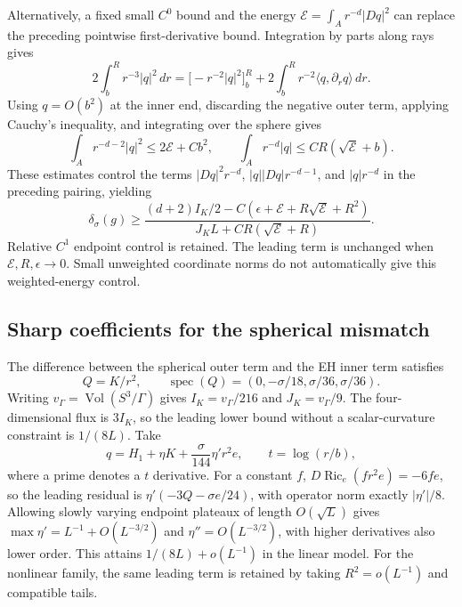 \documentclass[a4paper,11pt]{article}
\numberwithin{equation}{section}
\theoremstyle{definition}
\newcommand{\Ric}{\operatorname{Ric}}
\newcommand{\Vol}{\operatorname{Vol}}
\begin{document}
Alternatively, a fixed small $C^0$ bound and the energy
$\mathcal E=\int_A r^{-d}|Dq|^2$ can replace the preceding pointwise first-derivative bound.
Integration by parts along rays gives
\[
2\int_b^Rr^{-3}|q|^2\,dr
=\bigl[-r^{-2}|q|^2\bigr]_b^R+
2\int_b^Rr^{-2}\langle q,\partial_rq\rangle\,dr.
\]
Using $q=O(b^2)$ at the inner end, discarding the negative outer term, applying Cauchy's inequality, and integrating over the sphere gives
\[
\int_A r^{-d-2}|q|^2\le2\mathcal E+Cb^2,\qquad
\int_A r^{-d}|q|\le CR(\sqrt{\mathcal E}+b).
\]
These estimates control the terms
$|Dq|^2r^{-d}$, $|q||Dq|r^{-d-1}$, and $|q|r^{-d}$ in the preceding pairing, yielding
\begin{equation}\label{eq:energyflux}
\delta_\sigma(g)\ge
\frac{(d+2)I_K/2-C(\epsilon+\mathcal E+R\sqrt{\mathcal E}+R^2)}
{J_KL+CR(\sqrt{\mathcal E}+R)}.
\end{equation}
Relative $C^1$ endpoint control is retained. The leading term is unchanged when $\mathcal E,R,\epsilon\to0$.
Small unweighted coordinate norms do not automatically give this weighted-energy control.

\subsection{Sharp coefficients for the spherical mismatch}
The difference between the spherical outer term and the EH inner term satisfies
\[
Q=K/r^2,\qquad \operatorname{spec}(Q)=(0,-\sigma/18,\sigma/36,\sigma/36).
\]
Writing $v_\Gamma=\Vol(S^3/\Gamma)$ gives
$I_K=v_\Gamma/216$ and $J_K=v_\Gamma/9$.
The four-dimensional flux is $3I_K$, so the leading lower bound without a scalar-curvature constraint is $1/(8L)$.
Take
\[
q=H_1+\eta K+\frac{\sigma}{144}\eta' r^2e,\qquad t=\log(r/b),
\]
where a prime denotes a $t$ derivative. For a constant $f$,
$D\Ric_e(fr^2e)=-6f e$, so the leading residual is
$\eta'(-3Q-\sigma e/24)$, with operator norm exactly $|\eta'|/8$.
Allowing slowly varying endpoint plateaux of length $O(\sqrt L)$ gives
$\max\eta'=L^{-1}+O(L^{-3/2})$ and $\eta''=O(L^{-3/2})$,
with higher derivatives also lower order. This attains $1/(8L)+o(L^{-1})$ in the linear model.
For the nonlinear family, the same leading term is retained by taking $R^2=o(L^{-1})$ and compatible tails.
\end{document}
